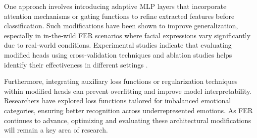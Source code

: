 One approach involves introducing adaptive MLP layers that incorporate attention mechanisms or gating functions to refine extracted features before classification. Such modifications have been shown to improve generalization, especially in \gls{in-the-wild} FER scenarios where facial expressions vary significantly due to real-world conditions. Experimental studies indicate that evaluating modified heads using cross-validation techniques and ablation studies helps identify their effectiveness in different settings \cite{abdullah_activator_2024}.

Furthermore, integrating auxiliary loss functions or regularization techniques within modified heads can prevent overfitting and improve model interpretability. Researchers have explored loss functions tailored for imbalanced emotional categories, ensuring better recognition across underrepresented emotions. As FER continues to advance, optimizing and evaluating these architectural modifications will remain a key area of research.


